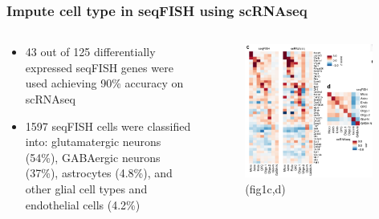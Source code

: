 \documentclass{beamer}
\begin{document}
  \begin{frame}
  \frametitle{Impute cell type in seqFISH using scRNAseq}
  \begin{columns}
  \begin{column}{0.5\textwidth}
    \begin{itemize}
      \item 43 out of 125 differentially expressed seqFISH genes were used achieving 90\% accuracy on scRNAseq
      \item 1597 seqFISH cells were classified into: glutamatergic neurons (54\%), GABAergic neurons (37\%), astrocytes (4.8\%), and other glial cell types and endothelial cells (4.2\%)
    \end{itemize}
  \end{column}
  \begin{column}{0.5\textwidth}  %
    \begin{figure}
      \centering
      \includegraphics[width=0.95\textwidth]{cell_type_gene} (fig1c,d)
    \end{figure}
  \end{column}
  \end{columns}
  \end{frame}
\end{document}
